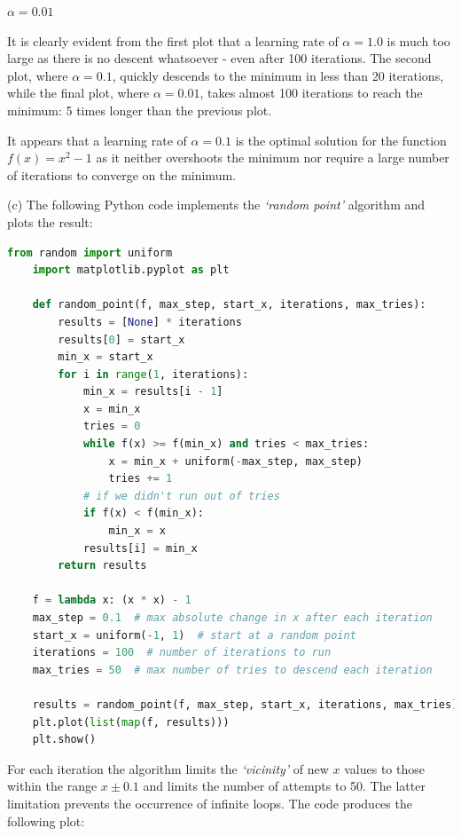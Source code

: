 \documentclass[12pt]{article}
\begin{document}
\begin{center}
    $\alpha = 0.01$
    
\end{center}

\indent It is clearly evident from the first plot that a learning rate of $\alpha = 1.0$ is much too large as there is no descent whatsoever - even after 100 iterations. The second plot, where $\alpha = 0.1$, quickly descends to the minimum in less than 20 iterations, while the final plot, where $\alpha = 0.01$, takes almost 100 iterations to reach the minimum: 5 times longer than the previous plot.

\indent It appears that a learning rate of $\alpha = 0.1$ is the optimal solution for the function $f(x) = x^2 - 1$ as it neither overshoots the minimum nor require a large number of iterations to converge on the minimum.

\noindent (c) The following Python code implements the {\it `random point'} algorithm and plots the result:

\begin{lstlisting}[language=Python]
    from random import uniform
    import matplotlib.pyplot as plt
    
    def random_point(f, max_step, start_x, iterations, max_tries):
    	results = [None] * iterations
    	results[0] = start_x
    	min_x = start_x
    	for i in range(1, iterations):
    		min_x = results[i - 1]
    		x = min_x
    		tries = 0
    		while f(x) >= f(min_x) and tries < max_tries:
    			x = min_x + uniform(-max_step, max_step)
    			tries += 1
    		# if we didn't run out of tries
    		if f(x) < f(min_x):
    			min_x = x
    		results[i] = min_x
    	return results
    
    f = lambda x: (x * x) - 1
    max_step = 0.1  # max absolute change in x after each iteration
    start_x = uniform(-1, 1)  # start at a random point
    iterations = 100  # number of iterations to run
    max_tries = 50  # max number of tries to descend each iteration
    
    results = random_point(f, max_step, start_x, iterations, max_tries)
    plt.plot(list(map(f, results)))
    plt.show()
\end{lstlisting}

\indent For each iteration the algorithm limits the {\it `vicinity'} of new $x$ values to those within the range $x \pm 0.1$ and limits the number of attempts to 50. The latter limitation prevents the occurrence of infinite loops. The code produces the following plot:
\end{document}
